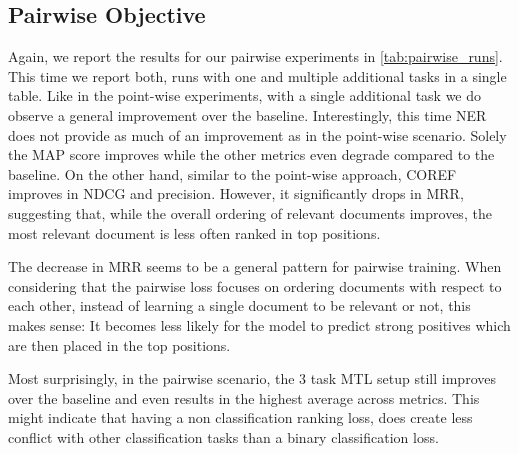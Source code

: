 \subsection{Pairwise Objective}
Again, we report the results for our pairwise experiments in \autoref{tab:pairwise_runs}. This time we report both, runs with one and multiple additional tasks in a single table. Like in the point-wise experiments, with a single additional task we do observe a general improvement over the baseline. Interestingly, this time NER does not provide as much of an improvement as in the point-wise scenario. Solely the MAP score improves while the other metrics even degrade compared to the baseline. On the other hand, similar to the point-wise approach, COREF improves in NDCG and precision. However, it significantly drops in MRR, suggesting that, while the overall ordering of relevant documents improves, the most relevant document is less often ranked in top positions.

The decrease in MRR seems to be a general pattern for pairwise training. When considering that the pairwise loss focuses on ordering documents with respect to each other, instead of learning a single document to be relevant or not, this makes sense: It becomes less likely for the model to predict strong positives which are then placed in the top positions.

Most surprisingly, in the pairwise scenario, the $3$ task MTL setup still improves over the baseline and even results in the highest average across metrics. This might indicate that having a non classification ranking loss, does create less conflict with other classification tasks than a binary classification loss.


